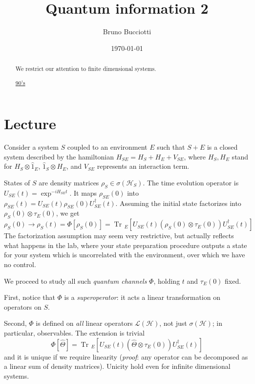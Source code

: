 \documentclass[a4paper, 11pt]{article}
\date{\today}
\author{Bruno Bucciotti}
\title{Quantum information 2}
\newcommand{\Tr}{\mathop{\mathrm{Tr}\!}{}}
\newcommand{\HH}{\mathcal{H}}
\begin{document}
	\maketitle
	
	\begin{abstract}
		We restrict our attention to finite dimensional systems.
		
		\href{https://www.youtube.com/watch?v=GyKcdbFGeV8}{90's}
		
	\end{abstract}

	\tableofcontents
	\clearpage
	\section{Lecture}
	Consider a system $S$ coupled to an environment $E$ such that $S+E$ is a closed system described by the hamiltonian $H_{SE} = H_S + H_E + V_{SE}$, where $H_S,H_E$ stand for $H_S\otimes \hat{1}_E$, $\hat{1}_S\otimes H_E$, and $V_{SE}$ represents an interaction term.
	
	States of $S$ are density matrices $\rho_S\in\sigma(\HH_S)$.
	The time evolution operator is $U_{SE}(t) = \exp^{-i H_{SE} t}$. It maps $\rho_{SE}(0)$ into $\rho_{SE}(t) = U_{SE}(t) \rho_{SE}(0) U^\dagger_{SE}(t)$. Assuming the initial state factorizes into $\rho_S(0)\otimes\tau_E(0)$, we get
	\[ \rho_S(0)\rightarrow \rho_S(t) = \Phi\left[\rho_S(0)\right] = \Tr_E\left[ U_{SE}(t) \left(\rho_S(0)\otimes\tau_E(0)\right) U^\dagger_{SE}(t) \right] \]
	The factorization assumption may seem very restrictive, but actually reflects what happens in the lab, where your state preparation procedure outputs a state for your system which is uncorrelated with the environment, over which we have no control.
	\vspace{5mm}
	
	We proceed to study all such \emph{quantum channels} $\Phi$, holding $t$ and $\tau_E(0)$ fixed.
	
	\noindent First, notice that $\Phi$ is a \emph{superoperator}: it acts a linear transformation on operators on $S$.
	
	\noindent Second, $\Phi$ is defined on \emph{all} linear operators $\mathcal{L}(\HH)$, not just $\sigma(\HH)$; in particular, observables. The extension is trivial
	\[ \Phi\left[\hat{\Theta}\right] = \Tr_E\left[ U_{SE}(t) \left(\hat{\Theta}\otimes\tau_E(0)\right) U^\dagger_{SE}(t) \right] \]
	and it is unique if we require linearity (\emph{proof}: any operator can be decomposed as a linear sum of density matrices). Unicity hold even for infinite dimensional systems.
	
\end{document}
